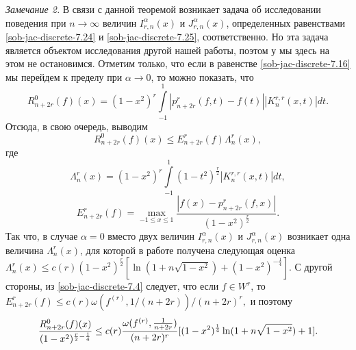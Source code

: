 \textit{Замечание 2.} В связи с данной теоремой возникает задача об исследовании поведения при $n\to\infty$ величин $I^\alpha_{r,n}(x)$ и $J^\alpha_{r,n}(x)$, определенных равенствами  \eqref{sob-jac-discrete-7.24} и \eqref{sob-jac-discrete-7.25}, соответственно. Но эта задача является объектом исследования другой нашей работы, поэтом
у мы здесь на этом не остановимся.
Отметим только, что если в равенстве \eqref{sob-jac-discrete-7.16} мы перейдем к пределу при $\alpha\to0$, то можно показать, что
$$
R_{n+2r}^0(f)(x)=(1-x^2)^r\int\limits_{-1}^1|p_{n+2r}^r(f,t)-f(t)|
|K_{n}^{r,r}(x,t)|dt.
$$
Отсюда, в свою очередь, выводим
$$
R_{n+2r}^0(f)(x)\le E_{n+2r}^r(f)\Lambda_{n}^r(x),
$$
где
$$
\Lambda_{n}^r(x)=(1-x^2)^r\int\limits_{-1}^1(1-t^2)^{\frac{r}{2}}|K_{n}^{r,r}(x,t)|dt,
$$
$$
E_{n+2r}^r(f)=\max_{-1\le x\le1}\frac{|f(x)-p_{n+2r}^r(f,x)|}{(1-x^2)^\frac{r}{2}}.
$$
Так что, в случае $\alpha=0$ вместо двух величин $I^\alpha_{r,n}(x)$ и $J^\alpha_{r,n}(x)$ возникает одна величина  $\Lambda_{n}^r(x)$, для которой в работе \cite{Haar-Tcheb-Shar15} получена следующая оценка
$
\Lambda_{n}^r(x)\le c(r)(1-x^2)^{\frac{r}{2}}[\ln(1+n\sqrt{1-x^2})+(1-x^2)^{-\frac{1}{4}}].
$
С другой стороны, из \eqref{sob-jac-discrete-7.4} следует, что если $f\in W^r$, то
$
E_{n+2r}^r(f)\le c(r)\omega(f^{(r)},1/(n+2r))/(n+2r)^r,
$
и поэтому
$$
\frac{R_{n+2r}^0(f)(x)}{(1-x^2)^{\frac{r}{2}-\frac14}}\le c(r)\frac{\omega(f^{(r)},{1\over n+2r})}{(n+2r)^r}[(1-x^2)^{\frac{1}{4}}\ln(1+n\sqrt{1-x^2})+1].
$$
